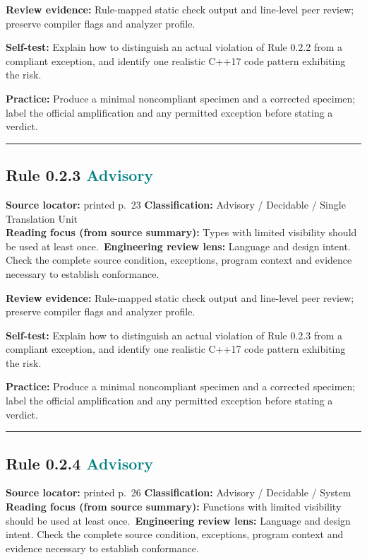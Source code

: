 \documentclass[10pt,letterpaper]{article}
\begin{document}
\textbf{Review evidence:} Rule-mapped static check output and line-level peer review; preserve compiler flags and analyzer profile.

\textbf{Self-test:} Explain how to distinguish an actual violation of Rule 0.2.2 from a compliant exception, and identify one realistic C++17 code pattern exhibiting the risk.\par
\textbf{Practice:} Produce a minimal noncompliant specimen and a corrected specimen; label the official amplification and any permitted exception before stating a verdict.
\smallskip\hrule\smallskip
\subsection*{Rule 0.2.3 \enspace \texorpdfstring{\small\textcolor{teal}{Advisory}}{Advisory}}
\noindent\textbf{Source locator:} printed p.~23 \quad\textbf{Classification:} Advisory / Decidable / Single Translation Unit\\
\textbf{Reading focus (from source summary):} Types with limited visibility should be used at least once.\
\textbf{Engineering review lens:} Language and design intent. Check the complete source condition, exceptions, program context and evidence necessary to establish conformance.

\textbf{Review evidence:} Rule-mapped static check output and line-level peer review; preserve compiler flags and analyzer profile.

\textbf{Self-test:} Explain how to distinguish an actual violation of Rule 0.2.3 from a compliant exception, and identify one realistic C++17 code pattern exhibiting the risk.\par
\textbf{Practice:} Produce a minimal noncompliant specimen and a corrected specimen; label the official amplification and any permitted exception before stating a verdict.
\smallskip\hrule\smallskip
\subsection*{Rule 0.2.4 \enspace \texorpdfstring{\small\textcolor{teal}{Advisory}}{Advisory}}
\noindent\textbf{Source locator:} printed p.~26 \quad\textbf{Classification:} Advisory / Decidable / System\\
\textbf{Reading focus (from source summary):} Functions with limited visibility should be used at least once.\
\textbf{Engineering review lens:} Language and design intent. Check the complete source condition, exceptions, program context and evidence necessary to establish conformance.
\end{document}
